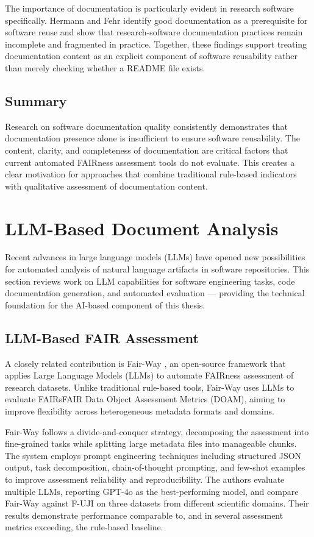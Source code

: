 The importance of documentation is particularly evident in research
software specifically. Hermann and Fehr \cite{hermann2022documenting}
identify good documentation as a prerequisite for software reuse and
show that research-software documentation practices remain incomplete
and fragmented in practice. Together, these findings support treating
documentation content as an explicit component of software
reusability rather than merely checking whether a README file exists.
\subsection{Summary}

Research on software documentation quality consistently demonstrates 
that documentation presence alone is insufficient to ensure software 
reusability. The content, clarity, and completeness of documentation 
are critical factors that current automated FAIRness assessment tools 
do not evaluate. This creates a clear motivation for approaches that combine 
traditional rule-based indicators with qualitative assessment of 
documentation content.

\section{LLM-Based Document Analysis}

Recent advances in large language models (LLMs) have opened new 
possibilities for automated analysis of natural language artifacts 
in software repositories. This section reviews work on LLM 
capabilities for software engineering tasks, code documentation 
generation, and automated evaluation — providing the technical 
foundation for the AI-based component of this thesis.

\subsection{LLM-Based FAIR Assessment}

A closely related contribution is Fair-Way \cite{sharma2025fairway},
an open-source framework that applies Large Language Models (LLMs) to
automate FAIRness assessment of research datasets. Unlike traditional
rule-based tools, Fair-Way uses LLMs to evaluate FAIRsFAIR Data Object
Assessment Metrics (DOAM), aiming to improve flexibility across
heterogeneous metadata formats and domains.

Fair-Way follows a divide-and-conquer strategy, decomposing
the assessment into fine-grained tasks while splitting large metadata
files into manageable chunks. The system employs prompt engineering
techniques including structured JSON output, task decomposition,
chain-of-thought prompting, and few-shot examples to improve assessment
reliability and reproducibility. The authors evaluate multiple LLMs,
reporting GPT-4o as the best-performing model, and compare Fair-Way
against F-UJI on three datasets from different scientific domains.
Their results demonstrate performance comparable to, and in several
assessment metrics exceeding, the rule-based baseline.

